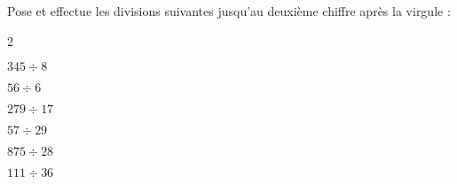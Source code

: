 Pose et effectue les divisions suivantes jusqu'au deuxième chiffre après la virgule :
\begin{multicols}2
  \begin{myenumerate}
  \item $345\div8$
  \item $56\div6$
    \item $279\div17$
    \item $57\div29$
    \item $875\div28$
    \item $111\div36$
  \end{myenumerate}
\end{multicols}
